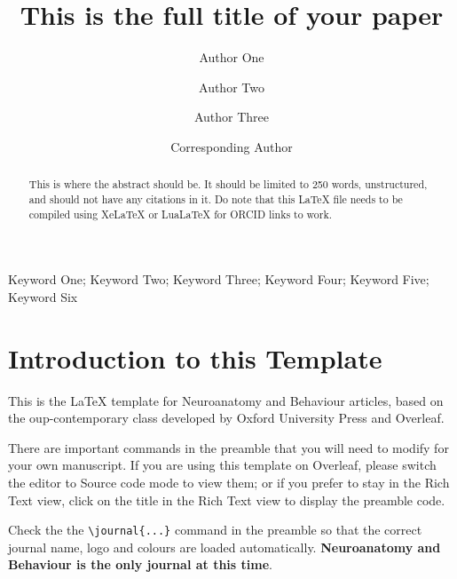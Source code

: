 \documentclass[a4paper,num-refs]{ehi-journals}
\title{This is the full title of your paper}
\author[1,\authfn{2}]{Author One\orcid{0000-0000-0000-0000}}
\author[1,2,\authfn{2}]{Author Two}
\author[1,2]{Author Three}
\author[1,\authfn{1}]{Corresponding Author}
\affil[1]{Affiliation 1}
\affil[2]{Affiliation 2}
\newcommand{\kwdone}{Keyword One}
\newcommand{\kwdtwo}{Keyword Two}
\newcommand{\kwdthree}{Keyword Three}
\newcommand{\kwdfour}{Keyword Four}
\newcommand{\kwdfive}{Keyword Five}
\newcommand{\kwdsix}{Keyword Six}
\begin{document}
\begin{frontmatter}
\maketitle
\begin{abstract}
This is where the abstract should be. It should be limited to 250 words, unstructured, and should not have any citations in it. Do note that this LaTeX file needs to be compiled using XeLaTeX or LuaLaTeX for ORCID links to work.
\end{abstract}

\begin{keywords}
\kwdone; \kwdtwo; \kwdthree; \kwdfour; \kwdfive; \kwdsix
\end{keywords}
\end{frontmatter}


\section{Introduction to this Template}


This is the \LaTeX{} template for Neuroanatomy and Behaviour articles, based on the oup-contemporary class developed by Oxford University Press and Overleaf. 

There are important commands in the preamble that you will need to modify for your own manuscript. If you are using this template on Overleaf, please switch the editor to Source code mode to view them; or if you prefer to stay in the Rich Text view, click on the title in the Rich Text view to display the preamble code.

Check the the \verb|\journal{...}| command in the preamble so that the correct journal name, logo and colours are loaded automatically. \textbf{Neuroanatomy and Behaviour is the only journal at this time}.
\end{document}

